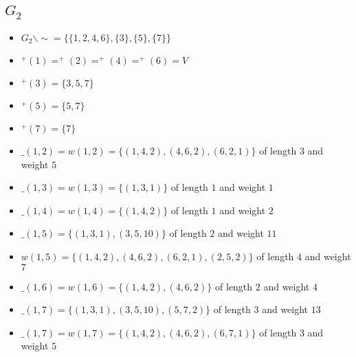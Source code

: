 \documentclass[a4paper,11pt,notitlepage]{article}
\begin{document}
\subsection{$G_2$}
\begin{itemize}
\item $G_2 \backslash\sim = \{\{1, 2, 4, 6\}, \{3\}, \{5\}, \{7\}\}$
\item $^+(1) = ^+(2) = ^+(4) = ^+(6) = V$
\item $^+(3) = \{3, 5, 7\}$
\item $^+(5) = \{5, 7\}$
\item $^+(7) = \{7\}$
\item $\_(1, 2) = w(1, 2) = \{(1, 4, 2), (4, 6, 2), (6, 2, 1)\}$ of length $3$ and weight $5$
\item $\_(1, 3) = w(1, 3) = \{(1, 3, 1)\}$ of length $1$ and weight $1$
\item $\_(1, 4) = w(1, 4) = \{(1, 4, 2)\}$ of length $1$ and weight $2$
\item $\_(1, 5) = \{(1, 3, 1), (3, 5, 10)\}$ of length $2$ and weight $11$
\item $w(1, 5) = \{(1, 4, 2), (4, 6, 2), (6, 2, 1), (2, 5, 2)\}$ of length $4$ and weight $7$
\item $\_(1, 6) = w(1, 6) = \{(1, 4, 2), (4, 6, 2)\}$ of length $2$ and weight $4$
\item $\_(1, 7) = \{(1, 3, 1), (3, 5, 10), (5, 7, 2)\}$ of length $3$ and weight $13$
\item $\_(1, 7) = w(1, 7) = \{(1, 4, 2), (4, 6, 2), (6, 7, 1)\}$ of length $3$ and weight $5$
\end{itemize}
\end{document}
